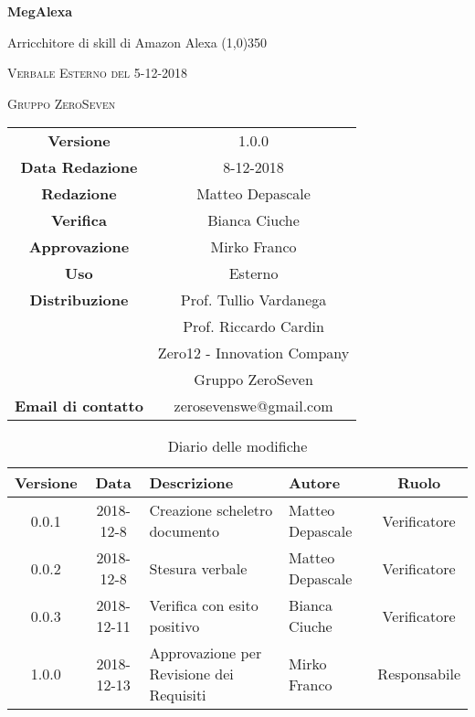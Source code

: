 \documentclass[a4paper,12pt]{article}
\author{Matteo Depascale}
\date{8-12-2018}
\begin{document}
\begin{titlepage}
	\centering
	{\huge\bfseries MegAlexa\par}
	Arricchitore di skill di Amazon Alexa
	\line(1,0){350} \\
	{\scshape\LARGE Verbale Esterno del 5-12-2018 \par}
	\vspace{1cm}
	{\scshape Gruppo ZeroSeven \par}
	\logo
	\begin{tabular}{c|c}
		{\hfill \textbf{Versione}} 			& 1.0.0				\\
		{\hfill\textbf{Data Redazione}} 	& 8-12-2018		\\ 
		{\hfill\textbf{Redazione}} 			&  		Matteo Depascale			\\ 
		{\hfill\textbf{Verifica}} 				&  		Bianca Ciuche		\\ 
		{\hfill\textbf{Approvazione}} 		&  		Mirko Franco	\\ 
		{\hfill\textbf{Uso}} 					& 	Esterno	\\ 
		{\hfill\textbf{Distribuzione}} 			& 			Prof. Tullio Vardanega \\ & Prof. Riccardo Cardin \\ & Zero12 - Innovation Company \\ & Gruppo ZeroSeven		\\ 
		{\hfill\textbf{Email di contatto}} & zerosevenswe@gmail.com \\
	\end{tabular}
\end{titlepage}
	

	
	\label{LastFrontPage}
	

	\newpage
	\cleardoublepage
		\begin{table}[tbph]
		\centering
		\begin{tabularx}{\textwidth}{|c|c|X|X|c|}
			\hline
			\textbf{Versione} & \textbf{Data} & \textbf{Descrizione} & \textbf{Autore} & \textbf{Ruolo} \\
			\hline
			0.0.1 & 2018-12-8 & Creazione scheletro documento
			& Matteo Depascale & Verificatore\\
			\hline
			0.0.2 & 2018-12-8 & Stesura verbale & Matteo Depascale & Verificatore \\
			\hline
			0.0.3 & 2018-12-11 & Verifica con esito positivo & Bianca Ciuche & Verificatore \\
			\hline
			1.0.0 & 2018-12-13 & Approvazione per Revisione dei Requisiti & Mirko Franco & Responsabile \\
			\hline
		\end{tabularx}
		\caption{Diario delle modifiche}
	\end{table}
	
\end{document}
